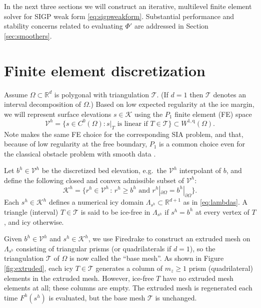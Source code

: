 \documentclass[letterpaper,final,12pt,reqno]{amsart}
\theoremstyle{claim}
\newcommand{\RR}{\mathbb{R}}
\newcommand{\qq}{{\text{q}}}
\numberwithin{equation}{section}
\numberwithin{figure}{section}
\numberwithin{table}{section}
\numberwithin{theorem}{section}
\begin{document}
In the next three sections we will construct an iterative, multilevel finite element solver for SIGP weak form \eqref{eq:sigpweakform}.  Substantial performance and stability concerns related to evaluating $\Phi'$ are addressed in Section \ref{sec:smoothers}.


\section{Finite element discretization} \label{sec:fe}

Assume $\Omega \subset \RR^d$ is polygonal with triangulation $\mathcal{T}$.  (If $d=1$ then $\mathcal{T}$ denotes an interval decomposition of $\Omega$.)  Based on low expected regularity at the ice margin, we will represent surface elevations $s\in \mathcal{K}$ using the $P_1$ finite element (FE) space
\begin{equation}
\mathcal{V}^h = \{s \in C^0(\Omega) : s|_T \text{ is linear if } T \in \mathcal{T}\} \subset W^{1,\qq}(\Omega).
\end{equation}
Note \cite{JouvetBueler2012} makes the same FE choice for the corresponding SIA problem, and that, because of low regularity at the free boundary, $P_1$ is a common choice even for the classical obstacle problem with smooth data \cite{GraeserKornhuber2009}.

Let $b^h \in \mathcal{V}^h$ be the discretized bed elevation, e.g.~the $\mathcal{V}^h$ interpolant of $b$, and define the following closed and convex admissible subset of $\mathcal{V}^h$:
\begin{equation}
\mathcal{K}^h = \{r^h \in \mathcal{V}^h \,:\, r^h \ge b^h \text{ and } r^h|_{\partial\Omega} = b^h|_{\partial\Omega}\}.  \label{eq:feK}
\end{equation}
Each $s^h\in \mathcal{K}^h$ defines a numerical icy domain $\Lambda_{s^h} \subset \RR^{d+1}$ as in \eqref{eq:lambdas}.  A triangle (interval) $T\in\mathcal{T}$ is said to be ice-free in $\Lambda_{s^h}$ if $s^h=b^h$ at every vertex of $T$, and icy otherwise.

Given $b^h \in \mathcal{V}^h$ and $s^h \in \mathcal{K}^h$, we use Firedrake to construct an extruded mesh \cite{McRaeetal2016} on $\Lambda_{s^h}$ consisting of triangular prisms (or quadrilaterals if $d=1$), so the triangulation $\mathcal{T}$ of $\Omega$ is now called the ``base mesh''.  As shown in Figure \ref{fig:extruded}, each icy $T \in \mathcal{T}$ generates a column of $m_z \ge 1$ prism (quadrilateral) elements in the extruded mesh.  However, ice-free $T$ have no extruded mesh elements at all; these columns are empty.  The extruded mesh is regenerated each time $F^h(s^h)$ is evaluated, but the base mesh $\mathcal{T}$ is unchanged.
\end{document}
